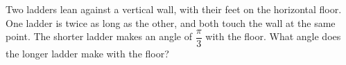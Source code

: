 Two ladders lean against a vertical wall, with their feet on the horizontal floor. One ladder is twice as long as the other, and both touch the wall at the same point. The shorter ladder makes an angle of $\dfrac\pi3$ with the floor. What angle does the longer ladder make with the floor?
